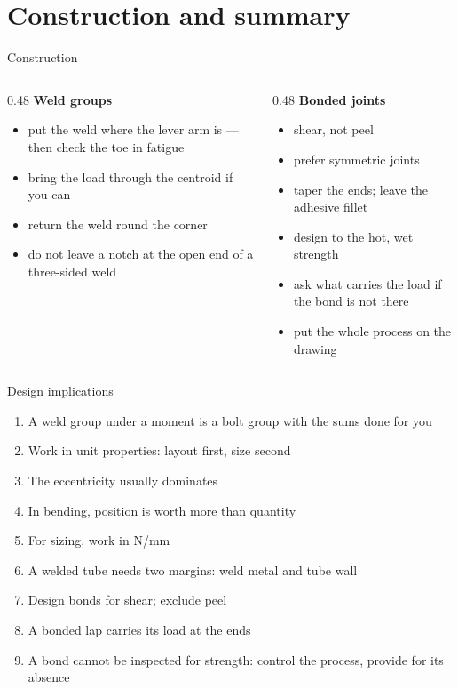 \documentclass[aspectratio=169,10pt]{beamer}
\begin{document}
\section{Construction and summary}

\begin{frame}{Construction}
\begin{columns}[T]
\begin{column}{0.48\textwidth}
\textbf{Weld groups}
\begin{itemize}
  \item put the weld where the lever arm is --- then check the toe in fatigue
  \item bring the load through the centroid if you can
  \item return the weld round the corner
  \item do not leave a notch at the open end of a three-sided weld
\end{itemize}
\end{column}
\begin{column}{0.48\textwidth}
\textbf{Bonded joints}
\begin{itemize}
  \item shear, not peel
  \item prefer symmetric joints
  \item taper the ends; leave the adhesive fillet
  \item design to the hot, wet strength
  \item ask what carries the load if the bond is not there
  \item put the whole process on the drawing
\end{itemize}
\end{column}
\end{columns}
\end{frame}

\begin{frame}{Design implications}
\begin{enumerate}
  \item A weld group under a moment is a bolt group with the sums done for you
  \item Work in unit properties: layout first, size second
  \item The eccentricity usually dominates
  \item In bending, position is worth more than quantity
  \item For sizing, work in N/mm
  \item A welded tube needs two margins: weld metal and tube wall
  \item Design bonds for shear; exclude peel
  \item A bonded lap carries its load at the ends
  \item A bond cannot be inspected for strength: control the process, provide for its absence
\end{enumerate}
\end{frame}
\end{document}
